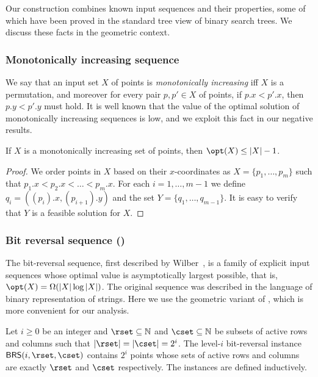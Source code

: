 Our construction combines known input sequences and their properties, some of which have been proved in the standard tree view of binary search trees.  We discuss these facts in the geometric context. 

 \subsubsection{Monotonically increasing sequence} 
 
 We say that an input set $X$ of points is \emph{monotonically increasing} iff $X$ is a permutation, and moreover for every pair $p,p'\in X$ of points, if $p.x <p'.x$, then $p.y<p'.y$ must hold.
It is well known that the value of the optimal solution of monotonically increasing sequences is low, and we exploit this fact in our negative results.
%

\begin{myobs}\label{obs: solution for monotone increasing set}
        If $X$ is a monotonically increasing set of points, then $\opt(X)\leq |X|-1$.
\end{myobs}
 \begin{proof}
We order points in $X$ based on their $x$-coordinates as $X = \{p_1,\ldots, p_m\}$ such that $p_1.x < p_2.x <\ldots < p_m.x$.
For each $i =1,\ldots, m-1$ we define $q_i = ((p_i).x, (p_{i+1}).y)$ and the set $Y = \{q_1,\ldots, q_{m-1}\}$. It is easy to verify that $Y$ is a feasible solution for $X$. 
 \end{proof}



\subsubsection{Bit reversal sequence (\BRS)} 


The bit-reversal sequence, first described by Wilber~\cite{wilber}, is a family of explicit input sequences whose optimal value is asymptotically largest possible, that is, $\opt(X) = \Omega(|X| \log |X|)$. 
The original sequence was described in the language of binary representation of strings. Here we use the geometric variant of \BRS, which is more convenient for our analysis. 

Let $i \geq 0$ be an integer and  $\rset \subseteq {\mathbb N}$ and $\cset \subseteq {\mathbb N}$ be subsets of active rows and columns such that  $|\rset|=|\cset|=2^i$. 
The level-$i$ bit-reversal instance ${\sf BRS}(i,\rset,\cset)$ contains $2^i$ points whose sets of active rows and columns are exactly $\rset$ and $\cset$ respectively. 
The instances are defined inductively. 

